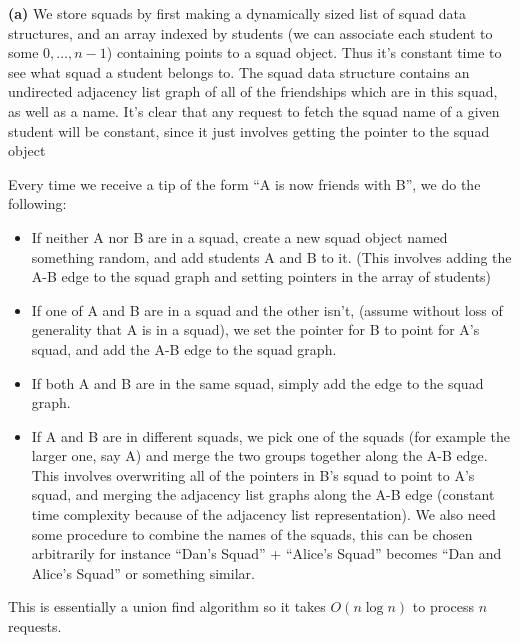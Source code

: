 \documentclass[11pt,letterpaper]{article}
\begin{document}
\begin{solution}
    \textbf{(a)} We store squads by first making a dynamically sized list of squad data structures, and an array indexed by students (we can associate each student to some $0,\ldots,n-1$) containing points to a squad object. Thus it's constant time to see what squad a student belongs to. The squad data structure contains an undirected adjacency list graph of all of the friendships which are in this squad, as well as a name. It's clear that any request to fetch the squad name of a given student will be constant, since it just involves getting the pointer to the squad object
    
    Every time we receive a tip of the form ``A is now friends with B'', we do the following:
    \begin{itemize}
        \item If neither A nor B are in a squad, create a new squad object named something random, and add students A and B to it. (This involves adding the A-B edge to the squad graph and setting pointers in the array of students)
        \item If one of A and B are in a squad and the other isn't, (assume without loss of generality that A is in a squad), we set the pointer for B to point for A's squad, and add the A-B edge to the squad graph.
        \item If both A and B are in the same squad, simply add the edge to the squad graph.
        \item If A and B are in different squads, we pick one of the squads (for example the larger one, say A) and merge the two groups together along the A-B edge. This involves overwriting all of the pointers in B's squad to point to A's squad, and merging the adjacency list graphs along the A-B edge (constant time complexity because of the adjacency list representation). We also need some procedure to combine the names of the squads, this can be chosen arbitrarily for instance ``Dan's Squad'' + ``Alice's Squad'' becomes ``Dan and Alice's Squad'' or something similar. 
    \end{itemize} 

    This is essentially a union find algorithm so it takes $O(n\log n)$ to process $n$ requests.


\end{solution}
\end{document}
